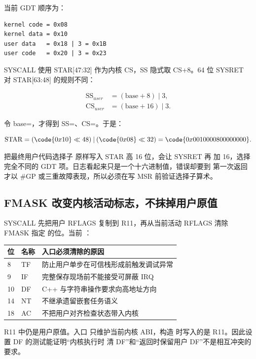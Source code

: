 当前 GDT 顺序为：

\begin{lstlisting}[caption={与 SYSCALL/SYSRET 配套的 GDT 选择子}]
kernel code = 0x08
kernel data = 0x10
user data   = 0x18 | 3 = 0x1B
user code   = 0x20 | 3 = 0x23
\end{lstlisting}

SYSCALL 使用 STAR[47:32] 作为内核 CS，SS 隐式取 CS+8。64 位 SYSRET 对
STAR[63:48] 的规则不同：

\[
\begin{aligned}
\mathrm{SS}_{user} &= (\mathrm{base}+8)\mathbin{|}3,\\
\mathrm{CS}_{user} &= (\mathrm{base}+16)\mathbin{|}3.
\end{aligned}
\]

令 base=，才得到 SS=、CS=。于是：

\[
  \mathrm{STAR}
  = (\code{0x10}\ll48)\mathbin{|}(\code{0x08}\ll32)
  = \code{0x0010000800000000}.
\]

\begin{failurebox}
把最终用户代码选择子  原样写入 STAR 高 16 位，会让 SYSRET 再
加 16，选择完全不同的 GDT 项。日志看起来只是一个十六进制值，错误却要到
第一次返回才以 \#GP 或三重故障表现，所以必须在写 MSR 前验证选择子算术。
\end{failurebox}

\subsection{FMASK 改变内核活动标志，不抹掉用户原值}

SYSCALL 先把用户 RFLAGS 复制到 R11，再从当前活动 RFLAGS 清除 FMASK 指定
的位。当前 ：

\begin{longtable}{L{0.12\textwidth}L{0.18\textwidth}L{0.58\textwidth}}
\toprule
位 & 名称 & 入口必须清除的原因\\
 & TF & 防止用户单步在可信栈形成前触发调试异常\\
9 & IF & 完整保存现场前不能接受可屏蔽 IRQ\\
10 & DF & C++ 与字符串操作要求向高地址方向\\
14 & NT & 不继承遗留嵌套任务语义\\
18 & AC & 不把用户对齐检查状态带入内核\\
\bottomrule
\end{longtable}

R11 中仍是用户原值。入口  只维护当前内核 ABI，构造
 时写入的是 R11。因此设置 DF 的测试能证明“内核执行时
清 DF”和“返回时保留用户 DF”不是相互冲突的要求。

